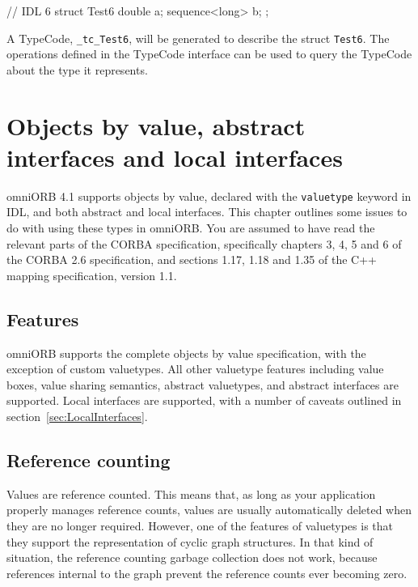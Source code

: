 \documentclass[11pt,twoside,a4paper]{book}
\newcommand{\type}[1]{\texttt{#1}}
\newcommand{\code}[1]{\texttt{#1}}
\begin{document}
\begin{idllisting}
// IDL 6
struct Test6 {
  double a;
  sequence<long> b;
};
\end{idllisting}

A TypeCode, \code{\_tc\_Test6}, will be generated to describe the
struct \type{Test6}. The operations defined in the TypeCode interface
can be used to query the TypeCode about the type it represents.


\chapter[Objects by value, etc.]
  {Objects by value, abstract interfaces and local interfaces}
\label{chap:valuetype}

omniORB 4.1 supports objects by value, declared with the
\code{valuetype} keyword in IDL, and both abstract and local
interfaces. This chapter outlines some issues to do with using these
types in omniORB. You are assumed to have read the relevant parts of
the CORBA specification, specifically chapters 3, 4, 5 and 6 of the
CORBA 2.6 specification, and sections 1.17, 1.18 and 1.35 of the C++
mapping specification, version 1.1.


\section{Features}

omniORB supports the complete objects by value specification, with the
exception of custom valuetypes. All other valuetype features including
value boxes, value sharing semantics, abstract valuetypes, and
abstract interfaces are supported. Local interfaces are supported,
with a number of caveats outlined in
section~\ref{sec:LocalInterfaces}.


\section{Reference counting}

Values are reference counted. This means that, as long as your
application properly manages reference counts, values are usually
automatically deleted when they are no longer required. However, one
of the features of valuetypes is that they support the representation
of cyclic graph structures. In that kind of situation, the reference
counting garbage collection does not work, because references internal
to the graph prevent the reference counts ever becoming zero.
\end{document}
